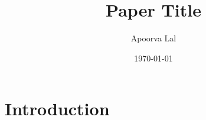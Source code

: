 

\usepackage{lipsum} %

\usepackage[
backend=biber,
style=authoryear,
citestyle=authoryear,
]{biblatex}




\title{Paper Title}

\author{Apoorva Lal}
\address{Stanford University, CA}



\date{\today}




\maketitle

\tableofcontents

\section{Introduction}


